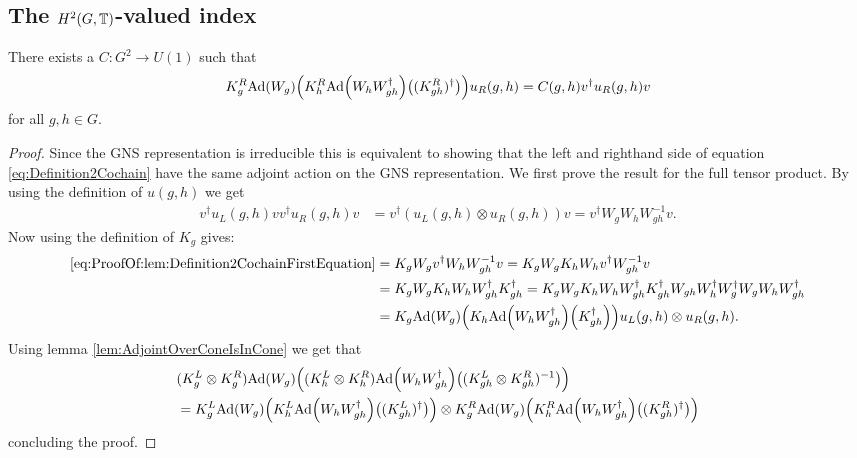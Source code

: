 \documentclass[11pt,a4paper,twoside]{article}
\numberwithin{equation}{section}
\begin{document}
	\subsection{The \texorpdfstring{$H^2(G,\mathbb T)$}{}-valued index}\label{sec:DefinitionH2Index}
	\begin{lemma}\label{lem:Definition2Cochain}
		There exists a $C:G^2\rightarrow U(1)$ such that 
		\begin{equation}\label{eq:Definition2Cochain}
			K_g^R\Ad{W_g}\left(K_h^R\Ad{W_hW_{gh}^\dagger}\left((K_{gh}^R)^\dagger\right)\right)u_
			R(g,h)=C(g,h)v^\dagger u_R(g,h)v
		\end{equation}
		for all $g,h\in G.$
	\end{lemma}
	\begin{proof}
		Since the GNS representation is irreducible this is equivalent to showing that the left and righthand side of equation \eqref{eq:Definition2Cochain} have the same adjoint action on the GNS representation. We first prove the result for the full tensor product. By using the definition of $u(g,h)$ we get
		\begin{align}\label{eq:ProofOf:lem:Definition2CochainFirstEquation}
			v^\dagger u_L(g,h)v v^\dagger u_R(g,h) v&=v^\dagger (u_L(g,h)\otimes u_R(g,h)) v =v^\dagger W_g W_h W_{gh}^{-1}v.
		\end{align}
		Now using the definition of $K_g$ gives:
		\begin{align}
			\eqref{eq:ProofOf:lem:Definition2CochainFirstEquation}&=K_gW_g v^\dagger W_h W_{gh}^{-1}v=K_gW_g K_h W_h v^\dagger W_{gh}^{-1}v\\
			&=K_gW_g K_h W_h W_{gh}^\dagger K_{gh}^\dagger=K_gW_g K_h W_h W_{gh}^\dagger K_{gh}^\dagger W_{gh}W_h^\dagger W_g^\dagger W_gW_hW_{gh}^\dagger\\
			&=K_g\Ad{W_g}\left(K_h\Ad{W_hW_{gh}^\dagger}\left(K_{gh}^\dagger\right)\right)u_L(g,h)\otimes u_
			R(g,h).
		\end{align}
		Using lemma \ref{lem:AdjointOverConeIsInCone} we get that
		\begin{align}
			&(K_g^L\otimes K_g^R)\Ad{W_g}\left((K_h^L\otimes K_h^R)\Ad{W_hW_{gh}^\dagger}\left((K_{gh}^L\otimes K_{gh}^R)^{-1}\right)\right)\\
			&=K_g^L\Ad{W_g}\left(K_h^L\Ad{W_hW_{gh}^\dagger}\left((K_{gh}^L)^\dagger\right)\right)\otimes K_g^R\Ad{W_g}\left(K_h^R\Ad{W_hW_{gh}^\dagger}\left((K_{gh}^R)^\dagger\right)\right)
		\end{align}
		concluding the proof.
	\end{proof}
\end{document}
